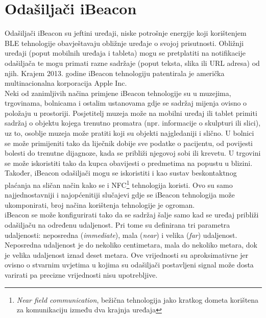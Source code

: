 \chapter{Odašiljači iBeacon}

Odašiljači iBeacon su jeftini uređaji, niske potrošnje energije koji korištenjem BLE tehnologije obavještavaju obližnje uređaje o svojoj prisutnosti. 
Obližnji uređaji (poput mobilnih uređaja i tableta) mogu se pretplatiti na notifikacije odašiljača te mogu primati razne sadržaje (poput teksta, slika ili URL adresa) od njih. 
Krajem 2013. godine iBeacon tehnologiju patentirala je američka multinacionalna korporacija Apple Inc.
\\

Neki od zanimljivih načina primjene iBeacon tehnologije su u muzejima, trgovinama, bolnicama i ostalim ustanovama gdje se sadržaj mijenja ovisno o položaju u prostoriji. 
Posjetitelj muzeja može na mobilni uređaj ili tablet primiti sadržaj o objektu kojega trenutno promatra (npr. informacije o skulpturi ili slici), uz to, osoblje muzeja može pratiti koji su objekti najgledaniji i slično. 
U bolnici se može primijeniti tako da liječnik dobije sve podatke o pacijentu, od povijesti bolesti do trenutne dijagnoze, kada se približi njegovoj sobi ili krevetu. 
U trgovini se može iskoristiti tako da kupca obavijesti o predmetima na popustu u blizini. 
Također, iBeacon odašiljači mogu se iskoristiti i kao sustav beskontaktnog plaćanja na sličan način kako se i NFC\footnote{\textit{Near field communication}, bežična tehnologija jako kratkog dometa korištena za komunikaciju između dva krajnja uređaja} tehnologija koristi.
Ovo su samo najjednostavniji i najopćenitiji slučajevi gdje se iBeacon tehnologija može ukomponirati, broj načina korištenja tehnologije je ogroman.
\\

iBeacon se može konfigurirati tako da se sadržaj šalje samo kad se uređaj približi odašiljaču na određenu udaljenost. 
Pri tome su definirana tri parametra udaljenosti: neposredna (\textit{immediate}), mala (\textit{near}) i velika (\textit{far}) udaljenost. 
Neposredna udaljenost je do nekoliko centimetara, mala do nekoliko metara, dok je velika udaljenost iznad deset metara. 
Ove vrijednosti su aproksimativne jer ovisno o stvarnim uvjetima u kojima su odašiljači postavljeni signal može dosta varirati pa precizne vrijednosti nisu upotrebljive.
\\

